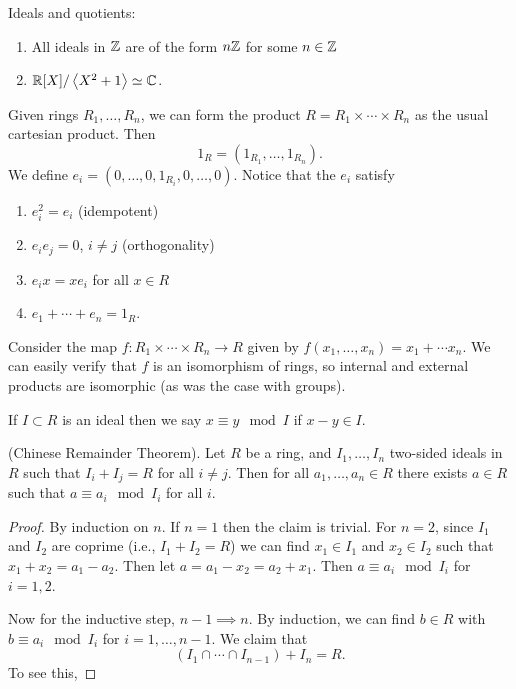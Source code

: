 \begin{eg}
  Ideals and quotients:
  \begin{enumerate}
  \item All ideals in $\mathbb{Z}$ are of the form $n \mathbb{Z}$ for some $n \in \mathbb{Z}$
  \item $\mathbb{R}[X] / \left\langle X^2 + 1 \right\rangle \simeq \mathbb{C}$.
  \end{enumerate}
\end{eg}

Given rings $R_1, \ldots, R_n$, we can form the product $R = R_1 \times \cdots \times R_n$ as the usual cartesian product. Then
\[
1_R = (1_{R_1}, \ldots, 1_{R_n}).
\]
We define $e_i = (0, \ldots, 0, 1_{R_i}, 0, \ldots, 0)$. Notice that the $e_i$ satisfy
\begin{enumerate}
\item $e_i^2 = e_i$ (idempotent)
\item $e_i e_j = 0$, $i \neq j$ (orthogonality)
\item $e_i x = x e_i$ for all $x \in R$
\item $e_1 + \cdots + e_n = 1_R$.
\end{enumerate}
Consider the map $f : R_1 \times \cdots \times R_n \to R$ given by $f(x_1, \ldots, x_n) = x_1 + \cdots x_n$. We can easily verify that $f$ is an isomorphism of rings, so internal and external products are isomorphic (as was the case with groups).

If $I \subset R$ is an ideal then we say $x \equiv y \mod I$ if $x - y \in I$.

\begin{thm}
  (Chinese Remainder Theorem). Let $R$ be a ring, and $I_1, \ldots, I_n$ two-sided ideals in $R$ such that $I_i + I_j = R$ for all $i \neq j$. Then for all $a_1, \ldots, a_n \in R$ there exists $a \in R$ such that $a \equiv a_i \mod I_i$ for all $i$.
\end{thm}
\begin{proof}
  By induction on $n$. If $n = 1$ then the claim is trivial. For $n = 2$, since $I_1$ and $I_2$ are coprime (i.e., $I_1 + I_2 = R$) we can find $x_1 \in I_1$ and $x_2 \in I_2$ such that $x_1 + x_2 = a_1 - a_2$. Then let $a = a_1 - x_2 = a_2 + x_1$. Then $a \equiv a_i \mod I_i$ for $i = 1,2$. 

  Now for the inductive step, $n -1 \implies n$. By induction, we can find $b \in R$ with $b \equiv a_i \mod I_i$ for $i = 1, \ldots, n-1$. We claim that
  \[
  (I_1 \cap \cdots \cap I_{n-1}) + I_n = R.
  \]
  To see this, 
\end{proof}
